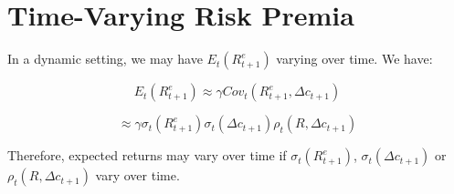 \chapter{Time-Varying Risk Premia}

In a dynamic setting, we may have $E_t(R^e_{t+1})$ varying over time. 
We have:

\begin{equation}
    E_t(R^e_{t+1}) \approx \gamma \textit{Cov}_t(R^e_{t+1}, \Delta c_{t+1})
\end{equation}

\begin{equation}
    \approx \gamma \sigma_t(R^e_{t+1}) \sigma_t(\Delta c_{t+1}) \rho_t(R, \Delta c_{t+1})
\end{equation}

Therefore, expected returns may vary over time 
if $\sigma_t(R^e_{t+1})$, $\sigma_t(\Delta c_{t+1})$ or $\rho_t(R, \Delta c_{t+1})$ vary over time.